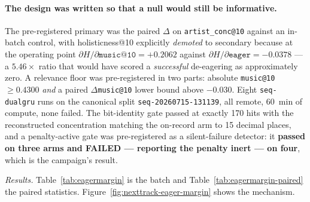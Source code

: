 \documentclass[11pt]{article}
\newcommand{\dsid}[1]{\texttt{\small #1}}
\begin{document}
\paragraph{The design was written so that a null would still be informative.} The
pre-registered primary was the paired $\Delta$ on \texttt{artist\_conc@10} against
an in-batch control, with holisticness@10 explicitly \emph{demoted} to secondary
because at the operating point $\partial H/\partial\texttt{music@10} =
+\num{0.2062}$ against $\partial H/\partial\texttt{eager} = -\num{0.0378}$ --- a
$\num{5.46}\times$ ratio that would have scored a \emph{successful} de-eagering as
approximately zero. A relevance floor was pre-registered in two parts: absolute
\texttt{music@10} $\ge\num{0.4300}$ \emph{and} a paired $\Delta$\texttt{music@10}
lower bound above $-\num{0.030}$. Eight \texttt{seq-dualgru} runs on the canonical
split \dsid{seq-20260715-131139}, all remote, \SI{60}{\minute} of compute, none
failed. The bit-identity gate passed at exactly \num{170} hits with the
reconstructed concentration matching the on-record arm to \num{15} decimal places,
and a penalty-active gate was pre-registered as a silent-failure detector: it
\textbf{passed on three arms and FAILED --- reporting the penalty inert --- on
four}, which is the campaign's result.

\emph{Results.} Table~\ref{tab:eagermargin} is the batch and
Table~\ref{tab:eagermargin-paired} the paired statistics.
Figure~\ref{fig:nexttrack-eager-margin} shows the mechanism.
\end{document}
